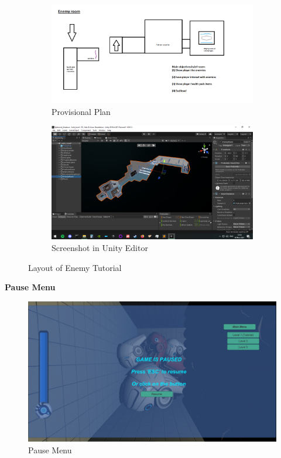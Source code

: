 \begin{figure}[H]
\centering
\begin{subfigure}{0.5\textwidth}
  \centering
  \includegraphics[width=1\linewidth]{Figures/enemyplan.png}
  \caption{Provisional Plan}
\end{subfigure}%
\begin{subfigure}{0.5\textwidth}
  \centering
  \includegraphics[width=1\linewidth]{Figures/enemy.png}
  \caption{Screenshot in Unity Editor}
\end{subfigure}
\caption{Layout of Enemy Tutorial}
\end{figure}




\textbf{Pause Menu}\\

\begin{figure}[H]
\centering
\includegraphics[scale=0.45]{Figures/pause.png}
\caption{Pause Menu}
\label{pause}
\end{figure}










